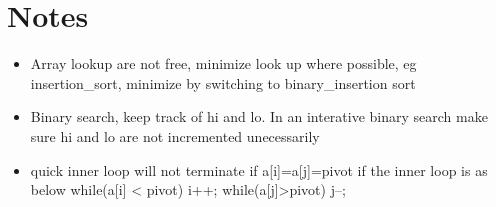 \documentclass{article}
\begin{document}
\renewcommand{\Re}{\ensuremath{\mathbb{R}}}
\newcommand{\norm}[1]{\ensuremath{\Vert#1\Vert}}
\newcommand{\abs}[1]{\ensuremath{\vert#1\vert}}
\newcommand{\rsSum}{\ensuremath{S(\pi,f,\alpha) }}
\newcommand{\ltwo}[1][]{\ensuremath{L^2#1}}
\newcommand{\para}{
   \vspace{.4cm}
   \ifthenelse { \value{OldSection} < \value{section} }
      { \setcounter{OldSection}{ \value{section} }
        \setcounter{ParCount}{ 0 } }
      {}
   \stepcounter{ParCount}
   \noindent
   \bf \arabic{section}.\arabic{ParCount}. \rm \hspace{.2cm}
 }

\section{Notes}

\begin{itemize}
\item Array lookup are not free, minimize look up where possible, eg insertion_sort, minimize by switching to binary_insertion sort
\item Binary search, keep track of hi and lo. In an interative binary search make sure hi and lo are not incremented unecessarily
\item quick inner loop will not terminate if a[i]=a[j]=pivot if the inner loop is as below 
while(a[i] < pivot) i++;
while(a[j]>pivot) j--;

\end{itemize}
\end{document}
